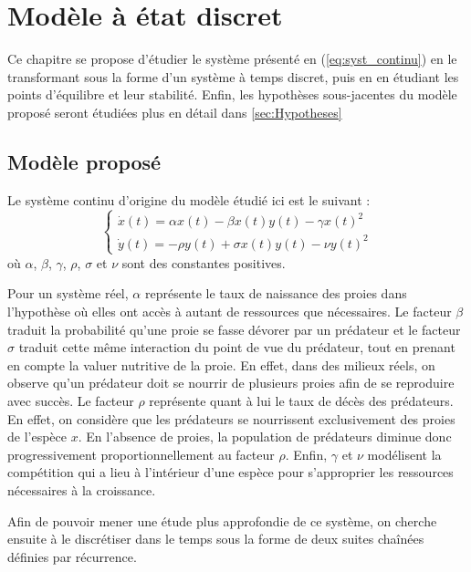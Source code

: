 \chapter{Modèle à état discret}
\label{ch:modele_discret}

Ce chapitre se propose d'étudier le système présenté en (\ref{eq:syst_continu}) en le transformant sous la forme d'un système à temps discret, puis en en étudiant les points d'équilibre et leur stabilité. Enfin, les hypothèses sous-jacentes du modèle proposé seront étudiées plus en détail dans \ref{sec:Hypotheses}

\section{Modèle proposé}
\label{sec:modele_propose}

Le système continu d'origine du modèle étudié ici est le suivant :
\begin{equation}
    \label{eq:syst_continu}
    \begin{cases}
        \dot{x}(t) = \alpha x(t) - \beta x(t) y(t) - \gamma x(t)^2 \\
        \dot{y}(t) = - \rho y(t) + \sigma x(t) y(t) - \nu y(t)^2
    \end{cases}
\end{equation}
où $\alpha$, $\beta$, $\gamma$, $\rho$, $\sigma$ et $\nu$ sont des constantes positives.

Pour un système réel, $\alpha$ représente le taux de naissance des proies dans l'hypothèse où elles ont accès à autant de ressources que nécessaires.
Le facteur $\beta$ traduit la probabilité qu'une proie se fasse dévorer par un prédateur et le facteur $\sigma$ traduit cette même interaction du point de vue du prédateur, tout en prenant en compte la valuer nutritive de la proie. En effet, dans des milieux réels, on observe qu'un prédateur doit se nourrir de plusieurs proies afin de se reproduire avec succès.
Le facteur $\rho$ représente quant à lui le taux de décès des prédateurs. En effet, on considère que les prédateurs se nourrissent exclusivement des proies de l'espèce $x$. En l'absence de proies, la population de prédateurs diminue donc progressivement proportionnellement au facteur $\rho$.
Enfin, $\gamma$ et $\nu$ modélisent la compétition qui a lieu à l'intérieur d'une espèce pour s'approprier les ressources nécessaires à la croissance.

Afin de pouvoir mener une étude plus approfondie de ce système, on cherche ensuite à le discrétiser dans le temps sous la forme de deux suites chaînées définies par récurrence.

